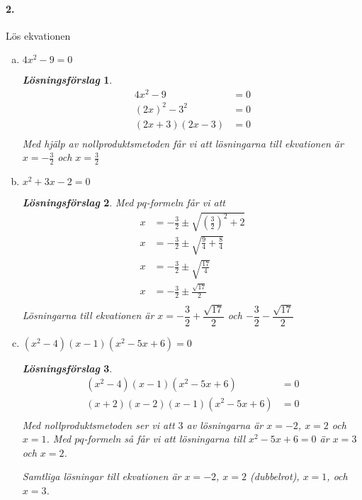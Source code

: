 \documentclass[a4paper]{article}
\newtheorem*{sol}{\normalfont\textit{Lösningsförslag}}
\begin{document}
\paragraph{2.} Lös ekvationen
\begin{enumerate}[(a)]
\item $4x^2 - 9 = 0$
  \begin{sol}
    \begin{align*}
      4x^2- 9 &= 0 \\[1em]
      (2x)^2- 3^2 &= 0 \\[1em]
      (2x+3)(2x-3) &= 0 \\[1em]
    \end{align*}
    Med hjälp av nollproduktsmetoden får vi att lösningarna till
    ekvationen är $x= -\frac{3}{2}$ och $x = \frac{3}{2}$
  \end{sol}
\item $x^2 + 3x -2 =0  $
  \begin{sol}
    Med $pq$-formeln får vi att
    \begin{align*}
      x &= - \frac{3}{2} \pm \sqrt{\left( \frac{3}{2} \right)^2 + 2} \\[1em]
      x &= - \frac{3}{2} \pm \sqrt{\frac{9}{4} + \frac{8}{4}} \\[1em]
      x &= - \frac{3}{2} \pm \sqrt{\frac{17}{4}} \\[1em]
      x &= - \frac{3}{2} \pm \frac{\sqrt{17}}{2} \\[1em]
    \end{align*}
    Lösningarna till ekvationen är $x = -\dfrac{3}{2} +
    \dfrac{\sqrt{17}}{2}$ och $- \dfrac{3}{2} - \dfrac{\sqrt{17}}{2}$ 
  \end{sol}
\item $(x^2-4)(x-1)(x^2 - 5x + 6) = 0$
  \begin{sol}
    \begin{align*}
      (x^2-4)(x-1)(x^2 - 5x + 6) &= 0 \\[1em]
      (x+2)(x-2)(x-1)(x^2 - 5x + 6) &= 0 \\[1em]
    \end{align*}
    Med nollproduktsmetoden ser vi att $3$ av lösningarna är $x= -2$,
    $x = 2$ och $x = 1$. Med $pq$-formeln så får vi att lösningarna
    till $x^2-5x+6 = 0$ är $x = 3$ och $x = 2$.

    Samtliga lösningar till ekvationen är $x = -2$, $x=2$ (dubbelrot), $x = 1$,
    och $x = 3$.
  \end{sol}
\end{enumerate}
\end{document}
